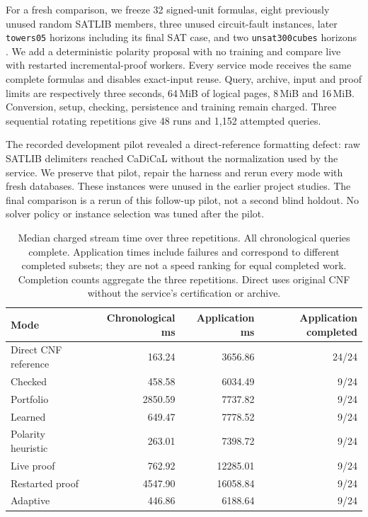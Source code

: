 \documentclass[11pt,a4paper]{article}
\numberwithin{equation}{section}
\theoremstyle{plain}
\theoremstyle{definition}
\theoremstyle{remark}
\begin{document}
For a fresh comparison, we freeze 32 signed-unit formulas, eight previously unused random SATLIB members, three unused circuit-fault instances, later \texttt{towers05} horizons including its final SAT case, and two \texttt{unsat300cubes} horizons \citep{satlib,schreiber2026realtime}. We add a deterministic polarity proposal with no training and compare live with restarted incremental-proof workers. Every service mode receives the same complete formulas and disables exact-input reuse. Query, archive, input and proof limits are respectively three seconds, 64\,MiB of logical pages, 8\,MiB and 16\,MiB. Conversion, setup, checking, persistence and training remain charged. Three sequential rotating repetitions give 48 runs and 1,152 attempted queries.

The recorded development pilot revealed a direct-reference formatting defect: raw SATLIB delimiters reached CaDiCaL without the normalization used by the service. We preserve that pilot, repair the harness and rerun every mode with fresh databases. These instances were unused in the earlier project studies. The final comparison is a rerun of this follow-up pilot, not a second blind holdout. No solver policy or instance selection was tuned after the pilot.

\begin{table}[tbp]
\centering
\small
\begin{tabular}{lrrr}
\toprule
Mode & Chronological ms & Application ms & Application completed \\
\midrule
Direct CNF reference & 163.24 & 3656.86 & 24/24 \\
Checked & 458.58 & 6034.49 & 9/24 \\
Portfolio & 2850.59 & 7737.82 & 9/24 \\
Learned & 649.47 & 7778.52 & 9/24 \\
Polarity heuristic & 263.01 & 7398.72 & 9/24 \\
Live proof & 762.92 & 12285.01 & 9/24 \\
Restarted proof & 4547.90 & 16058.84 & 9/24 \\
Adaptive & 446.86 & 6188.64 & 9/24 \\
\bottomrule
\end{tabular}
\caption{Median charged stream time over three repetitions. All chronological queries complete. Application times include failures and correspond to different completed subsets; they are not a speed ranking for equal completed work. Completion counts aggregate the three repetitions. Direct uses original CNF without the service's certification or archive.}
\label{tab:priorities}
\end{table}
\end{document}
